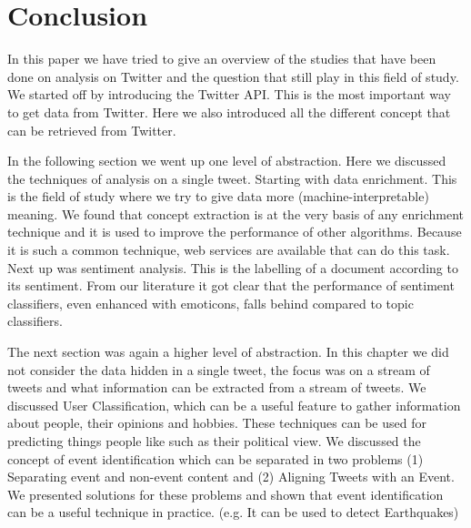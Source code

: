 \documentclass{article}
\begin{document}
\section{Conclusion}
In this paper we have tried to give an overview of the studies that have been done on analysis on Twitter and the question that still play in this field of study. We started off by introducing the Twitter API. This is the most important way to get data from Twitter. Here we also introduced all the different concept that can be retrieved from Twitter. 

In the following section we went up one level of abstraction. Here we discussed the techniques of analysis on a single tweet. Starting with data enrichment. This is the field of study where we try to give data more (machine-interpretable) meaning. We found that concept extraction is at the very basis of any enrichment technique and it is used to improve the performance of other algorithms. Because it is such a common technique, web services are available that can do this task. Next up was sentiment analysis. This is the labelling of a document according to its sentiment. From our literature it got clear that the performance of sentiment classifiers, even enhanced with emoticons, falls behind compared to topic classifiers. 

The next section was again a higher level of abstraction. In this chapter we did not consider the data hidden in a single tweet, the focus was on a stream of tweets and what information can be extracted from a stream of tweets. We discussed User Classification, which can be a useful feature to gather information about people, their opinions and hobbies. These techniques can be used for predicting things people like such as their political view. We discussed the concept of event identification which can be separated in two problems (1) Separating event and non-event content and (2) Aligning Tweets with an Event. We presented solutions for these problems and shown that event identification can be a useful technique in practice. (e.g. It can be used to detect Earthquakes)



\end{document}
